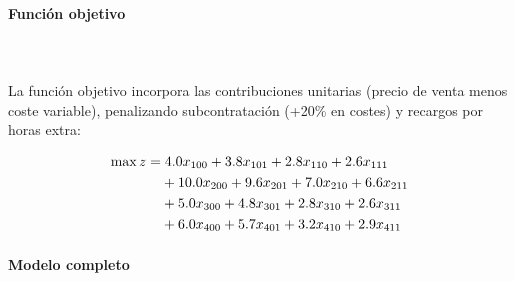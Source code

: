 \paragraph{Función objetivo}\mbox{}\\
\\
La función objetivo incorpora las contribuciones unitarias (precio de venta menos coste variable), 
penalizando subcontratación (+20\% en costes) y recargos por horas extra:

\begin{align}
\max z = & \; 4.0x_{100} + 3.8x_{101} + 2.8x_{110} + 2.6x_{111} \notag \\
&+ 10.0x_{200} + 9.6x_{201} + 7.0x_{210} + 6.6x_{211} \notag \\
&+ 5.0x_{300} + 4.8x_{301} + 2.8x_{310} + 2.6x_{311} \notag \\
&+ 6.0x_{400} + 5.7x_{401} + 3.2x_{410} + 2.9x_{411}
\end{align}



\paragraph{Modelo completo}\mbox{}\\

